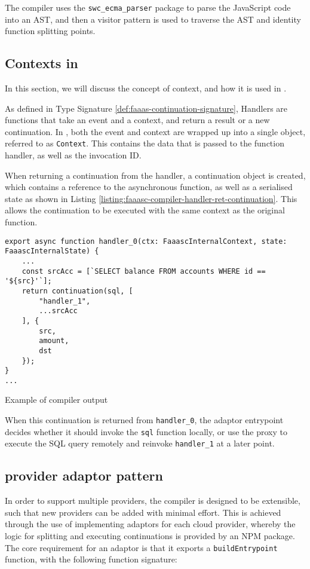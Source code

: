 The \faaasc{} compiler uses the \verb|swc_ecma_parser| package to parse the JavaScript code into an AST, and then a visitor pattern is used to traverse the AST and identity function splitting points.

\subsection{Contexts in \faaasc{}}
In this section, we will discuss the concept of context, and how it is used in \faaasc{}.

As defined in Type Signature \ref{def:faaas-continuation-signature}, Handlers are functions that take an event and a context, and return a result or a new continuation. In \faaasc{}, both the event and context are wrapped up into a single object, referred to as \verb|Context|. This contains the data that is passed to the function handler, as well as the invocation ID.

When returning a continuation from the handler, a continuation object is created, which contains a reference to the asynchronous function, as well as a serialised state as shown in Listing \ref{listing:faaasc-compiler-handler-ret-continuation}. This allows the continuation to be executed with the same context as the original function.

\begin{listing}[H]
\begin{verbatim}
export async function handler_0(ctx: FaaascInternalContext, state: FaaascInternalState) {
    ...
    const srcAcc = [`SELECT balance FROM accounts WHERE id == '${src}'`];
    return continuation(sql, [
        "handler_1",
        ...srcAcc
    ], {
        src,
        amount,
        dst
    });
}
...
\end{verbatim}
\caption{Example of \faaasc{} compiler output}
\label{listing:faaasc-compiler-handler-ret-continuation}
\end{listing}

When this continuation is returned from \verb|handler_0|, the adaptor entrypoint decides whether it should invoke the \verb|sql| function locally, or use the proxy to execute the SQL query remotely and reinvoke \verb|handler_1| at a later point.

\subsection{\faas{} provider adaptor pattern}
In order to support multiple \faas{} providers, the \faaasc{} compiler is designed to be extensible, such that new providers can be added with minimal effort. This is achieved through the use of implementing adaptors for each cloud provider, whereby the logic for splitting and executing continuations is provided by an NPM package. The core requirement for an adaptor is that it exports a \verb|buildEntrypoint| function, with the following function signature:

